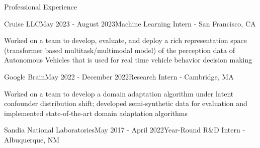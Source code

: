 \documentclass[11pt]{resume} %
\begin{document}
\begin{rSection}{Professional Experience}

\begin{rSubsection}{Cruise LLC}{May 2023 - August 2023}{Machine Learning Intern - San Francisco, CA}

    \setlength\itemsep{0em}
    \item  Worked on a team to develop, evaluate, and deploy a rich representation space (transformer based multitask/multimodal model) of the  perception data of Autonomous Vehicles that is used for real time vehicle behavior decision making

\end{rSubsection}

\begin{rSubsection}{Google Brain}{May 2022 - December 2022}{Research Intern - Cambridge, MA}

    \setlength\itemsep{0em}
    \item Worked on a team to develop a domain adaptation algorithm under latent confounder distribution shift;
    developed semi-synthetic data for evaluation and implemented state-of-the-art domain adaptation algorithms

\end{rSubsection}

\begin{rSubsection}{Sandia National Laboratories}{May 2017 - April 2022}{Year-Round R\&D Intern - Albuquerque, NM}


\end{rSubsection}
\end{rSection}
\end{document}
